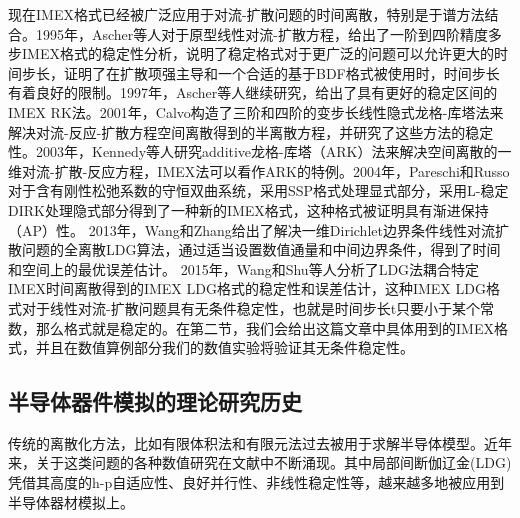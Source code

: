 现在IMEX格式已经被广泛应用于对流-扩散问题的时间离散，特别是于谱方法结合。1995年，Ascher等人对于原型线性对流-扩散方程，给出了一阶到四阶精度多步IMEX格式的稳定性分析，说明了稳定格式对于更广泛的问题可以允许更大的时间步长，证明了在扩散项强主导和一个合适的基于BDF格式被使用时，时间步长有着良好的限制\parencite{ascher1995implicit}。1997年，Ascher等人继续研究，给出了具有更好的稳定区间的IMEX RK法。2001年，Calvo构造了三阶和四阶的变步长线性隐式龙格-库塔法来解决对流-反应-扩散方程空间离散得到的半离散方程，并研究了这些方法的稳定性\cite{calvo2001linearly}。2003年，Kennedy等人研究additive龙格-库塔（ARK）法来解决空间离散的一维对流-扩散-反应方程，IMEX法可以看作ARK的特例。2004年，Pareschi和Russo对于含有刚性松弛系数的守恒双曲系统，采用SSP格式处理显式部分，采用L-稳定DIRK处理隐式部分得到了一种新的IMEX格式，这种格式被证明具有渐进保持（AP）性。
2013年，Wang和Zhang给出了解决一维Dirichlet边界条件线性对流扩散问题的全离散LDG算法，通过适当设置数值通量和中间边界条件，得到了时间和空间上的最优误差估计\cite{shu2007efficient}。
2015年，Wang和Shu等人分析了LDG法耦合特定IMEX时间离散得到的IMEX LDG格式的稳定性和误差估计，这种IMEX LDG格式对于线性对流-扩散问题具有无条件稳定性，也就是时间步长t只要小于某个常数，那么格式就是稳定的\cite{wang2015stability}。在第二节，我们会给出这篇文章中具体用到的IMEX格式，并且在数值算例部分我们的数值实验将验证其无条件稳定性。

\subsection{半导体器件模拟的理论研究历史}
传统的离散化方法，比如有限体积法\cite{bank1983numerical,bank1998finite,chainais2003finite,bessemoulin2012finite}和有限元法\cite{brezzi1989two,mauri20153d}过去被用于求解半导体模型。近年来，关于这类问题的各种数值研究在文献中不断涌现。其中局部间断伽辽金(LDG)凭借其高度的h-p自适应性、良好并行性、非线性稳定性等，越来越多地被应用到半导体器材模拟上。

